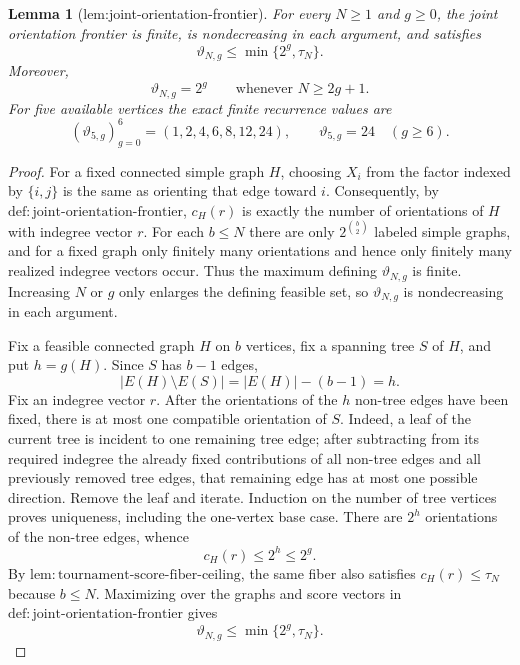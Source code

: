 \documentclass{article}
\newtheorem{lemma}{Lemma}
\begin{document}
\begin{lemma}[lem:joint-orientation-frontier]\label{lem:joint-orientation-frontier}
For every \(N\geq1\) and \(g\geq0\), the joint orientation frontier is finite, is nondecreasing in each argument, and satisfies
\[
 \vartheta_{N,g}\leq\min\{2^g,\tau_N\}.
\]
Moreover,
\[
 \vartheta_{N,g}=2^g\qquad\text{whenever }N\geq2g+1.
\]
For five available vertices the exact finite recurrence values are
\[
 (\vartheta_{5,g})_{g=0}^{6}=(1,2,4,6,8,12,24),
 \qquad
 \vartheta_{5,g}=24\quad(g\geq6).
\]
\end{lemma}
\begin{proof}
For a fixed connected simple graph \(H\), choosing \(X_i\) from the factor indexed by \(\{i,j\}\) is the same as orienting that edge toward \(i\).  Consequently, by \(\mathrm{def:joint\mbox{-}orientation\mbox{-}frontier}\), \(c_H(r)\) is exactly the number of orientations of \(H\) with indegree vector \(r\).  For each \(b\leq N\) there are only \(2^{\binom b2}\) labeled simple graphs, and for a fixed graph only finitely many orientations and hence only finitely many realized indegree vectors occur.  Thus the maximum defining \(\vartheta_{N,g}\) is finite.  Increasing \(N\) or \(g\) only enlarges the defining feasible set, so \(\vartheta_{N,g}\) is nondecreasing in each argument.

Fix a feasible connected graph \(H\) on \(b\) vertices, fix a spanning tree \(S\) of \(H\), and put \(h=g(H)\).  Since \(S\) has \(b-1\) edges,
\[
 |E(H)\setminus E(S)|=|E(H)|-(b-1)=h.
\tag{1}
\]
Fix an indegree vector \(r\).  After the orientations of the \(h\) non-tree edges have been fixed, there is at most one compatible orientation of \(S\).  Indeed, a leaf of the current tree is incident to one remaining tree edge; after subtracting from its required indegree the already fixed contributions of all non-tree edges and all previously removed tree edges, that remaining edge has at most one possible direction.  Remove the leaf and iterate.  Induction on the number of tree vertices proves uniqueness, including the one-vertex base case.  There are \(2^h\) orientations of the non-tree edges, whence
\[
 c_H(r)\leq 2^h\leq 2^g.
\tag{2}
\]
By \(\mathrm{lem:tournament\mbox{-}score\mbox{-}fiber\mbox{-}ceiling}\), the same fiber also satisfies \(c_H(r)\leq\tau_N\) because \(b\leq N\).  Maximizing over the graphs and score vectors in \(\mathrm{def:joint\mbox{-}orientation\mbox{-}frontier}\) gives
\[
 \vartheta_{N,g}\leq\min\{2^g,\tau_N\}.
\tag{3}
\]


\end{proof}
\end{document}
